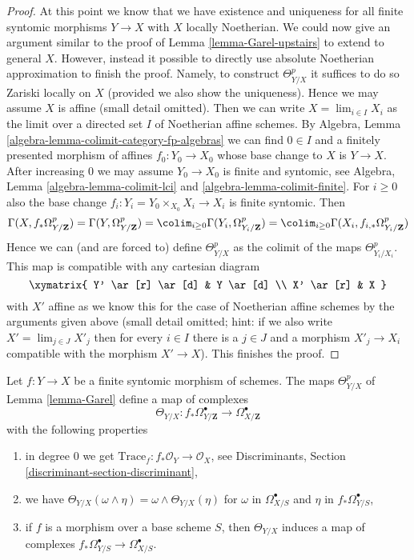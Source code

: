 \begin{proof}
\medskip\noindent
At this point we know that we have existence and uniqueness
for all finite syntomic morphisms $Y \to X$ with $X$ locally Noetherian.
We could now give an argument similar to the proof of
Lemma \ref{lemma-Garel-upstairs} to extend to general $X$.
However, instead it possible to directly use absolute Noetherian approximation
to finish the proof. Namely, to construct $\Theta^p_{Y/X}$
it suffices to do so Zariski locally on $X$ (provided we also
show the uniqueness). Hence we may assume $X$ is affine (small
detail omitted). Then we can write $X = \lim_{i \in I} X_i$
as the limit over a directed set $I$ of Noetherian affine schemes.
By Algebra, Lemma \ref{algebra-lemma-colimit-category-fp-algebras}
we can find $0 \in I$ and a finitely
presented morphism of affines $f_0 : Y_0 \to X_0$ whose base change to
$X$ is $Y \to X$. After increasing $0$ we may assume $Y_0 \to X_0$
is finite and syntomic, see
Algebra, Lemma \ref{algebra-lemma-colimit-lci} and
\ref{algebra-lemma-colimit-finite}. For $i \geq 0$ also the
base change $f_i : Y_i = Y_0 \times_{X_0} X_i \to X_i$ is finite syntomic.
Then
$$
\Gamma(X, f_*\Omega^p_{Y/\mathbf{Z}}) =
\Gamma(Y, \Omega^p_{Y/\mathbf{Z}}) =
\colim_{i \geq 0} \Gamma(Y_i, \Omega^p_{Y_i/\mathbf{Z}}) =
\colim_{i \geq 0} \Gamma(X_i, f_{i, *}\Omega^p_{Y_i/\mathbf{Z}})
$$
Hence we can (and are forced to) define $\Theta^p_{Y/X}$ as the colimit
of the maps $\Theta^p_{Y_i/X_i}$. This map is compatible with any
cartesian diagram
$$
\xymatrix{
Y' \ar[r] \ar[d] & Y \ar[d] \\
X' \ar[r] & X
}
$$
with $X'$ affine as we know this for the case of Noetherian affine schemes
by the arguments given above (small detail omitted; hint: if we also
write $X' = \lim_{j \in J} X'_j$ then for every $i \in I$ there is a $j \in J$
and a morphism $X'_j \to X_i$ compatible with the morphism $X' \to X$).
This finishes the proof.
\end{proof}

\begin{proposition}
\label{proposition-Garel}
\begin{reference}
\cite{Garel}
\end{reference}
Let $f : Y \to X$ be a finite syntomic morphism of schemes.
The maps $\Theta^p_{Y/X}$ of Lemma \ref{lemma-Garel} define a map of complexes
$$
\Theta_{Y/X} :
f_*\Omega^\bullet_{Y/\mathbf{Z}}
\longrightarrow
\Omega^\bullet_{X/\mathbf{Z}}
$$
with the following properties
\begin{enumerate}
\item in degree $0$ we get
$\text{Trace}_f : f_*\mathcal{O}_Y \to \mathcal{O}_X$, see
Discriminants, Section \ref{discriminant-section-discriminant},
\item we have
$\Theta_{Y/X}(\omega \wedge \eta) = \omega \wedge \Theta_{Y/X}(\eta)$
for $\omega$ in $\Omega^\bullet_{X/S}$ and $\eta$
in $f_*\Omega^\bullet_{Y/S}$,
\item if $f$ is a morphism over a base scheme $S$, then
$\Theta_{Y/X}$ induces a map of complexes
$f_*\Omega^\bullet_{Y/S} \to \Omega^\bullet_{X/S}$.
\end{enumerate}
\end{proposition}

